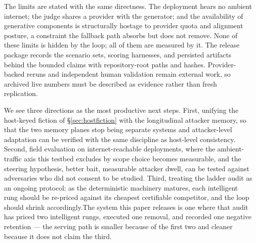 The limits are stated with the same directness. The deployment hears no ambient
internet; the judge shares a provider with the generator; and the
availability of generative components is structurally hostage to provider
quota and alignment posture, a constraint the fallback path absorbs but
does not remove. None of these limits is hidden by the loop; all of them
are measured by it. The release package records the scenario sets, scoring
harnesses, and persisted artifacts behind the bounded claims with
repository-root paths and hashes. Provider-backed reruns and independent
human validation remain external work, so archived live numbers must be
described as evidence rather than fresh replication.

We see three directions as the most productive next steps. First, unifying
the host-keyed fiction of \S\ref{sec:hostfiction} with the longitudinal
attacker memory, so that the two memory planes stop being separate systems
and attacker-level adaptation can be verified with the same discipline as
host-level consistency. Second, field evaluation on
internet-reachable deployments, where the ambient-traffic axis this
testbed excludes by scope choice becomes measurable, and the steering
hypothesis, better bait, measurable attacker dwell, can be tested against
adversaries who did not consent to be studied. Third, treating the ladder
audit as an ongoing protocol: as the deterministic machinery matures,
each intelligent rung should be re-priced against its cheapest
certifiable competitor, and the loop should shrink accordingly.The system this paper releases is one where that audit has priced two
intelligent rungs, executed one removal, and recorded one negative
retention --- the serving path is smaller because of the first two and
cleaner because it does not claim the third.
